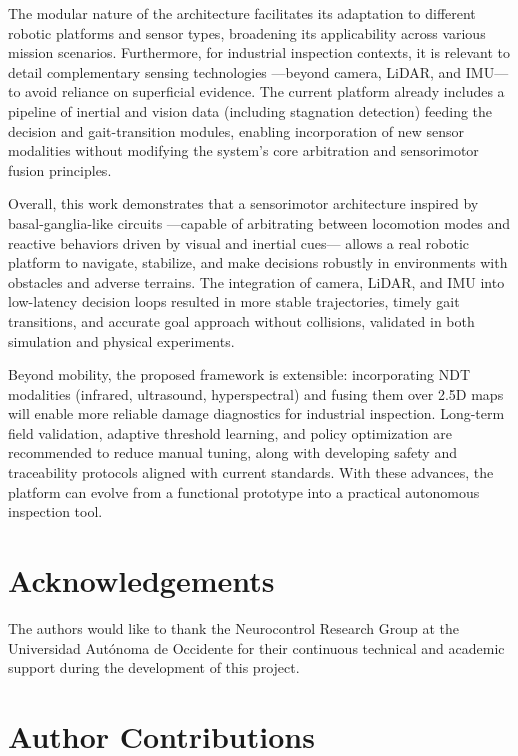 \documentclass[preprint,12pt]{elsarticle}
\begin{document}
The modular nature of the architecture facilitates its adaptation to different robotic platforms and sensor types, broadening its applicability across various mission scenarios. Furthermore, for industrial inspection contexts, it is relevant to detail complementary sensing technologies ---beyond camera, LiDAR, and IMU--- to avoid reliance on superficial evidence. The current platform already includes a pipeline of inertial and vision data (including stagnation detection) feeding the decision and gait-transition modules, enabling incorporation of new sensor modalities without modifying the system’s core arbitration and sensorimotor fusion principles. 

Overall, this work demonstrates that a sensorimotor architecture inspired by basal-ganglia-like circuits ---capable of arbitrating between locomotion modes and reactive behaviors driven by visual and inertial cues--- allows a real robotic platform to navigate, stabilize, and make decisions robustly in environments with obstacles and adverse terrains. The integration of camera, LiDAR, and IMU into low-latency decision loops resulted in more stable trajectories, timely gait transitions, and accurate goal approach without collisions, validated in both simulation and physical experiments. 

Beyond mobility, the proposed framework is extensible: incorporating NDT modalities (infrared, ultrasound, hyperspectral) and fusing them over 2.5D maps will enable more reliable damage diagnostics for industrial inspection. Long-term field validation, adaptive threshold learning, and policy optimization are recommended to reduce manual tuning, along with developing safety and traceability protocols aligned with current standards. With these advances, the platform can evolve from a functional prototype into a practical autonomous inspection tool. 

\section*{Acknowledgements}

The authors would like to thank the Neurocontrol Research Group at the Universidad Autónoma de Occidente for their continuous technical and academic support during the development of this project.

\section*{Author Contributions}
\end{document}
